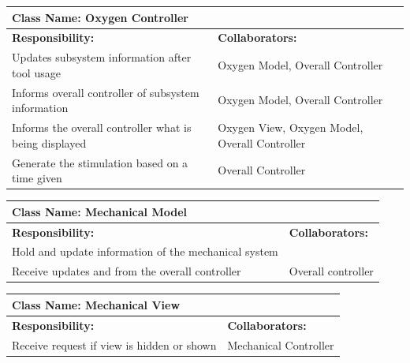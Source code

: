 \documentclass[12pt, titlepage]{article}
\begin{document}
\begin{enumerate}[a)]
	\begin{table}[H]
		\centering
		\begin{tabular}{|p{10cm}|p{5cm}|}
		\hline 
		 \multicolumn{2}{|l|}{\textbf{Class Name: Oxygen Controller}} \\
		\hline
		\textbf{Responsibility:} & \textbf{Collaborators:} \\
		\hline
		Updates subsystem information after tool usage & Oxygen Model, Overall Controller\\
		\hline
		 Informs overall controller of subsystem information & Oxygen Model, Overall Controller\\
		\hline
		 Informs the overall controller what is being displayed & Oxygen View, Oxygen Model, Overall Controller\\
		\hline
		 Generate the stimulation based on a time given & Overall Controller \\
		\hline
		\end{tabular}
	\end{table}

	\begin{table}[H]
		\centering
		\begin{tabular}{|p{10cm}|p{5cm}|}
		\hline 
		 \multicolumn{2}{|l|}{\textbf{Class Name: Mechanical Model}} \\
		\hline
		\textbf{Responsibility:} & \textbf{Collaborators:} \\
		\hline
		 Hold and update information of the mechanical system & \\
		\hline
		Receive updates and from the overall controller & Overall controller \\
		\hline
		\end{tabular}
	\end{table}

	\begin{table}[H]
		\centering
		\begin{tabular}{|p{10cm}|p{5cm}|}
		\hline 
		 \multicolumn{2}{|l|}{\textbf{Class Name: Mechanical View}} \\
		\hline
		\textbf{Responsibility:} & \textbf{Collaborators:} \\
		\hline
		 Receive request if view is hidden or shown & Mechanical Controller\\
		\hline
		\end{tabular}
	\end{table}


\end{enumerate}
\end{document}
